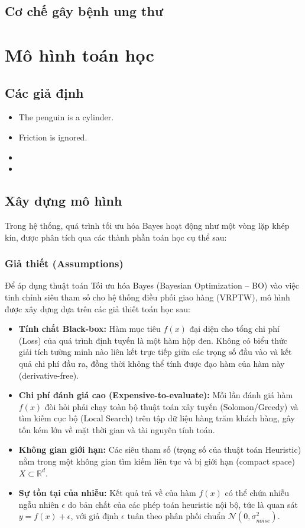 \documentclass[twoside,12pt]{article}
\begin{document}
\subsection{Cơ chế gây bệnh ung thư}
\lipsum[3]
\section{Mô hình toán học}
\subsection{Các giả định}
\lipsum[2]
\begin{itemize}
    \item The penguin is a cylinder.~\lipsum[9][1-3]

    \item Friction is ignored.~\lipsum[3][1-3]

    \item \lipsum[4][1-3]

    \item \lipsum[5][1-3]
\end{itemize}

\subsection{Xây dựng mô hình}
Trong hệ thống, quá trình tối ưu hóa Bayes hoạt động như một vòng lặp khép kín, được phân tích qua các thành phần toán học cụ thể sau:

\subsubsection{Giả thiết (Assumptions)}
Để áp dụng thuật toán Tối ưu hóa Bayes (Bayesian Optimization -- BO) vào việc tinh chỉnh siêu tham số cho hệ thống điều phối giao hàng (VRPTW), mô hình được xây dựng dựa trên các giả thiết toán học sau:
\begin{itemize}
    \item \textbf{Tính chất Black-box:} Hàm mục tiêu $f(x)$ đại diện cho tổng chi phí (Loss) của quá trình định tuyến là một hàm hộp đen. Không có biểu thức giải tích tường minh nào liên kết trực tiếp giữa các trọng số đầu vào và kết quả chi phí đầu ra, đồng thời không thể tính được đạo hàm của hàm này (derivative-free).
    \item \textbf{Chi phí đánh giá cao (Expensive-to-evaluate):} Mỗi lần đánh giá hàm $f(x)$ đòi hỏi phải chạy toàn bộ thuật toán xây tuyến (Solomon/Greedy) và tìm kiếm cục bộ (Local Search) trên tập dữ liệu hàng trăm khách hàng, gây tốn kém lớn về mặt thời gian và tài nguyên tính toán.
    \item \textbf{Không gian giới hạn:} Các siêu tham số (trọng số của thuật toán Heuristic) nằm trong một không gian tìm kiếm liên tục và bị giới hạn (compact space) $X \subset \mathbb{R}^d$.
    \item \textbf{Sự tồn tại của nhiễu:} Kết quả trả về của hàm $f(x)$ có thể chứa nhiễu ngẫu nhiên $\epsilon$ do bản chất của các phép toán heuristic nội bộ, tức là quan sát $y=f(x)+\epsilon$, với giả định $\epsilon$ tuân theo phân phối chuẩn $\mathcal{N}(0,\sigma_{noise}^2)$.
\end{itemize}
\end{document}
